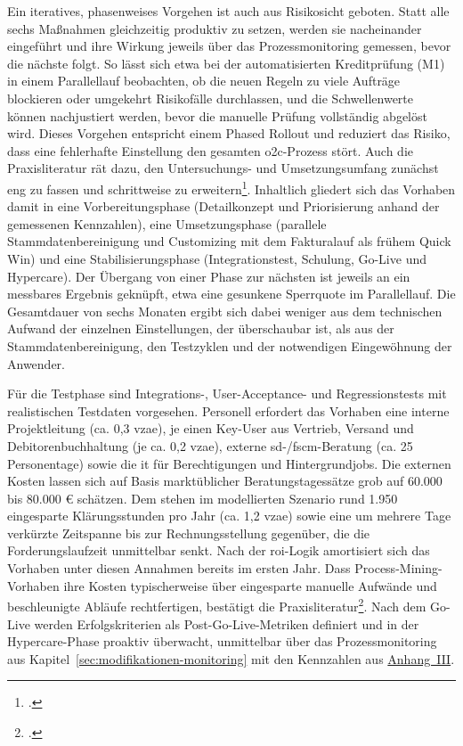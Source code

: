 Ein iteratives, phasenweises Vorgehen ist auch aus Risikosicht geboten. Statt alle sechs Maßnahmen gleichzeitig produktiv zu setzen, werden sie nacheinander eingeführt und ihre Wirkung jeweils über das Prozessmonitoring gemessen, bevor die nächste folgt. So lässt sich etwa bei der automatisierten Kreditprüfung (M1) in einem Parallellauf beobachten, ob die neuen Regeln zu viele Aufträge blockieren oder umgekehrt Risikofälle durchlassen, und die Schwellenwerte können nachjustiert werden, bevor die manuelle Prüfung vollständig abgelöst wird. Dieses Vorgehen entspricht einem Phased Rollout und reduziert das Risiko, dass eine fehlerhafte Einstellung den gesamten \gls{o2c}-Prozess stört. Auch die Praxisliteratur rät dazu, den Untersuchungs- und Umsetzungsumfang zunächst eng zu fassen und schrittweise zu erweitern\footcite[Vgl.][S.~71 f.]{adolfsson2026o2c}. Inhaltlich gliedert sich das Vorhaben damit in eine Vorbereitungsphase (Detailkonzept und Priorisierung anhand der gemessenen Kennzahlen), eine Umsetzungsphase (parallele Stammdatenbereinigung und Customizing mit dem Fakturalauf als frühem Quick Win) und eine Stabilisierungsphase (Integrationstest, Schulung, Go-Live und Hypercare). Der Übergang von einer Phase zur nächsten ist jeweils an ein messbares Ergebnis geknüpft, etwa eine gesunkene Sperrquote im Parallellauf. Die Gesamtdauer von sechs Monaten ergibt sich dabei weniger aus dem technischen Aufwand der einzelnen Einstellungen, der überschaubar ist, als aus der Stammdatenbereinigung, den Testzyklen und der notwendigen Eingewöhnung der Anwender.

Für die Testphase sind Integrations-, User-Acceptance- und Regressionstests mit realistischen Testdaten vorgesehen. Personell erfordert das Vorhaben eine interne Projektleitung (ca. 0,3 \gls{vzae}), je einen Key-User aus Vertrieb, Versand und Debitorenbuchhaltung (je ca. 0,2 \gls{vzae}), externe \gls{sd}-/\gls{fscm}-Beratung (ca. 25 Personentage) sowie die \gls{it} für Berechtigungen und Hintergrundjobs. Die externen Kosten lassen sich auf Basis marktüblicher Beratungstagessätze grob auf 60.000 bis 80.000 \euro{} schätzen. Dem stehen im modellierten Szenario rund 1.950 eingesparte Klärungsstunden pro Jahr (ca. 1,2 \gls{vzae}) sowie eine um mehrere Tage verkürzte Zeitspanne bis zur Rechnungsstellung gegenüber, die die Forderungslaufzeit unmittelbar senkt. Nach der \gls{roi}-Logik amortisiert sich das Vorhaben unter diesen Annahmen bereits im ersten Jahr. Dass Process-Mining-Vorhaben ihre Kosten typischerweise über eingesparte manuelle Aufwände und beschleunigte Abläufe rechtfertigen, bestätigt die Praxisliteratur\footcite[Vgl.][S.~21 ff.]{peters2019processmining}. Nach dem Go-Live werden Erfolgskriterien als Post-Go-Live-Metriken definiert und in der Hypercare-Phase proaktiv überwacht, unmittelbar über das Prozessmonitoring aus Kapitel~\ref{sec:modifikationen-monitoring} mit den Kennzahlen aus \hyperref[anh:kennzahlen]{Anhang~III}.

